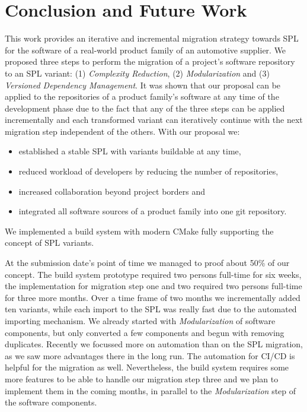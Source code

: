 \section{Conclusion and Future Work}

This work provides an iterative and incremental migration strategy towards SPL
for the software of a real-world product family of an automotive supplier. We
proposed three steps to perform the migration of a project's software repository
to an SPL variant: (1) \textit{Complexity Reduction}, (2)
\textit{Modularization} and (3) \textit{Versioned Dependency Management}. It was
shown that our proposal can be applied to the repositories of a product family's
software at any time of the development phase due to the fact that any of the
three steps can be applied incrementally and each transformed variant can
iteratively continue with the next migration step independent of the others.
With our proposal we:

\begin{itemize}
  \item established a stable SPL with variants buildable at any time,
  \item reduced workload of developers by reducing the number of repositories,
  \item increased collaboration beyond project borders and
  \item integrated all software sources of a product family into one git
        repository.
\end{itemize}

We implemented a build system with modern CMake fully supporting the concept of
SPL variants.

At the submission date's point of time we managed to proof about 50\% of our
concept. The build system prototype required two persons full-time for six
weeks, the implementation for migration step one and two required two persons
full-time for three more months. Over a time frame of two months we
incrementally added ten variants, while each import to the SPL was really fast
due to the automated importing mechanism. We already started with
\textit{Modularization} of software components, but only converted a few
components and begun with removing duplicates. Recently we focussed more on
automation than on the SPL migration, as we saw more advantages there in the
long run. The automation for CI/CD is helpful for the migration as well.
Nevertheless, the build system requires some more features to be able to handle
our migration step three and we plan to implement them in the coming months, in
parallel to the \textit{Modularization} step of the software components.

